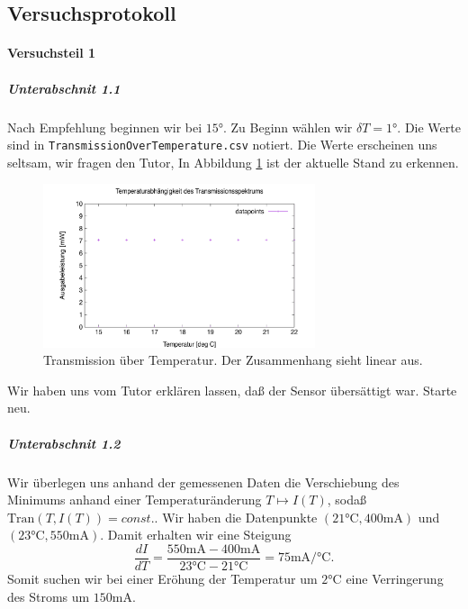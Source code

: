 \documentclass{subfiles}
\begin{document}
    \subsection*{Versuchsprotokoll} 
        

        \paragraph*{Versuchsteil 1}

            \subparagraph*{Unterabschnit 1.1}
                Nach Empfehlung beginnen wir bei $15\si{\degree}$. Zu Beginn wählen wir $\delta T = 1\si{\degree}$. Die Werte sind in \texttt{TransmissionOverTemperature.csv} notiert. Die Werte erscheinen uns seltsam, wir fragen den Tutor, In Abbildung \ref{fig:TransmissionOverTemperatureSuS} ist der aktuelle Stand zu erkennen.
                \begin{figure}[H]
                    \centering
                    \includegraphics[width=8cm]{Bilddateien/TransmissionOverTemperatureSuS.png}
                    \caption{Transmission über Temperatur. Der Zusammenhang sieht linear aus.}
                    \label{fig:TransmissionOverTemperatureSuS}
                \end{figure}
                Wir haben uns vom Tutor erklären lassen, daß der Sensor übersättigt war. 
                Starte neu.
            \subparagraph*{Unterabschnit 1.2}
                Wir überlegen uns anhand der gemessenen Daten die Verschiebung des Minimums anhand einer Temperaturänderung $T\mapsto I(T)$, sodaß $\text{Tran}(T,I(T))=const.$. Wir haben die Datenpunkte $(21\si{\celsius},400\si{\milli\ampere})$ und $(23\si{\celsius},550\si{\mA})$. Damit erhalten wir eine Steigung 
                \[
                    \frac{dI}{dT} = \frac{550\si{\mA}-400\si{\mA}}{23\si{\celsius}-21\si{\celsius}} = 75\si{\mA\per\celsius}.
                \] 
                Somit suchen wir bei einer Eröhung der Temperatur um $2\si{\celsius}$ eine Verringerung des Stroms um $150\si{\mA}$.
\end{document}
